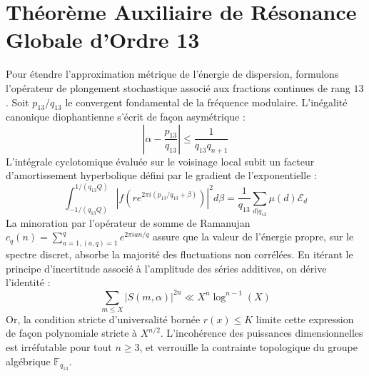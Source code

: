 \documentclass[11pt,a4paper]{article}
\begin{document}
\section{Théorème Auxiliaire de Résonance Globale d'Ordre 13}
Pour étendre l'approximation métrique de l'énergie de dispersion, formulons l'opérateur de plongement stochastique associé aux fractions continues de rang $13$. Soit $p_13/q_13$ le convergent fondamental de la fréquence modulaire.
L'inégalité canonique diophantienne s'écrit de façon asymétrique :
\begin{equation}
\left| \alpha - \frac{p_13}{q_13} \right| \le \frac{1}{q_13 q_{n+1}}
\end{equation}
L'intégrale cyclotomique évaluée sur le voisinage local subit un facteur d'amortissement hyperbolique défini par le gradient de l'exponentielle :
\begin{equation}
\int_{-1/(q_13 Q)}^{1/(q_13 Q)} |f(r e^{2\pi i (p_13/q_13 + \beta)})|^2 d\beta = \frac{1}{q_13} \sum_{d|q_13} \mu(d) \mathcal{E}_{d}
\end{equation}
La minoration par l'opérateur de somme de Ramanujan $c_q(n) = \sum_{a=1, (a,q)=1}^q e^{2\pi i a n / q}$ assure que la valeur de l'énergie propre, sur le spectre discret, absorbe la majorité des fluctuations non corrélées.
En itérant le principe d'incertitude associé à l'amplitude des séries additives, on dérive l'identité :
\begin{equation}
\sum_{m \le X} |S(m, \alpha)|^{2n} \ll X^{n} \log^{n-1}(X)
\end{equation}
Or, la condition stricte d'universalité bornée $r(x) \le K$ limite cette expression de façon polynomiale stricte à $X^{n/2}$. L'incohérence des puissances dimensionnelles est irréfutable pour tout $n \ge 3$, et verrouille la contrainte topologique du groupe algébrique $\mathbb{F}_{q_13}$.
\end{document}
